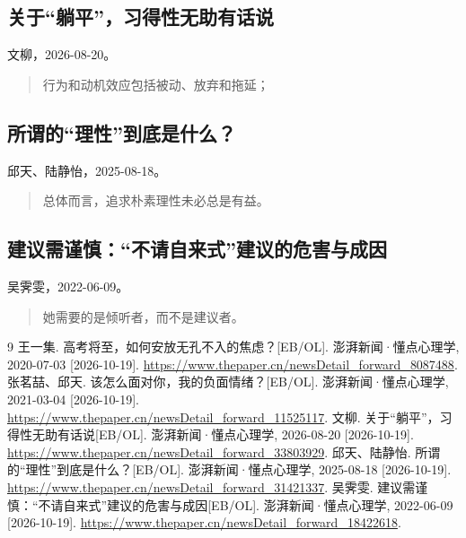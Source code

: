 \documentclass[UTF8,a4paper,zihao=-4,fontset=fandol]{ctexart}
\begin{document}
\subsection*{关于“躺平”，习得性无助有话说}
文柳，2026-08-20。\cite{helpless}
\begin{quote}
行为和动机效应包括被动、放弃和拖延；
\end{quote}
\subsection*{所谓的“理性”到底是什么？}
邱天、陆静怡，2025-08-18。\cite{reason}
\begin{quote}
总体而言，追求朴素理性未必总是有益。
\end{quote}
\subsection*{建议需谨慎：“不请自来式”建议的危害与成因}
吴霁雯，2022-06-09。\cite{advice}
\begin{quote}
她需要的是倾听者，而不是建议者。
\end{quote}

\begin{thebibliography}{9}
 王一集. 高考将至，如何安放无孔不入的焦虑？[EB/OL]. 澎湃新闻·懂点心理学, 2020-07-03 [2026-10-19].\newline
\url{https://www.thepaper.cn/newsDetail_forward_8087488}.
 张茗{喆}、邱天. 该怎么面对你，我的负面情绪？[EB/OL]. 澎湃新闻·懂点心理学, 2021-03-04 [2026-10-19].\newline
\url{https://www.thepaper.cn/newsDetail_forward_11525117}.
 文柳. 关于“躺平”，习得性无助有话说[EB/OL]. 澎湃新闻·懂点心理学, 2026-08-20 [2026-10-19].\newline
\url{https://www.thepaper.cn/newsDetail_forward_33803929}.
 邱天、陆静怡. 所谓的“理性”到底是什么？[EB/OL]. 澎湃新闻·懂点心理学, 2025-08-18 [2026-10-19].\newline
\url{https://www.thepaper.cn/newsDetail_forward_31421337}.
 吴霁雯. 建议需谨慎：“不请自来式”建议的危害与成因[EB/OL]. 澎湃新闻·懂点心理学, 2022-06-09 [2026-10-19].\newline
\url{https://www.thepaper.cn/newsDetail_forward_18422618}.
\end{thebibliography}
\end{document}
